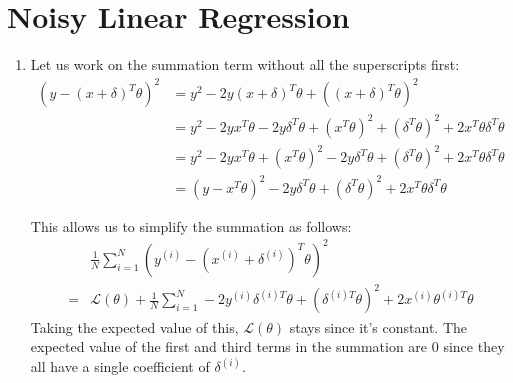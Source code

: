 \documentclass[12pt]{article}
\begin{document}
\section{Noisy Linear Regression}

\begin{enumerate}[label=(\alph*)]
      \item Let us work on the summation term without all the superscripts first:
            \begin{align*}
                  \left(y-(x+\delta)^T\theta\right)^2
                   & = y^2-2y(x+\delta)^T\theta+((x+\delta)^T\theta)^2                                                                  \\
                   & = y^2-2yx^T\theta-2y\delta^T\theta+\left(x^T\theta\right)^2+\left(\delta^T\theta\right)^2+2x^T\theta\delta^T\theta \\
                   & = y^2-2yx^T\theta+\left(x^T\theta\right)^2-2y\delta^T\theta+\left(\delta^T\theta\right)^2+2x^T\theta\delta^T\theta \\
                   & = \left(y-x^T\theta\right)^2-2y\delta^T\theta+\left(\delta^T\theta\right)^2+2x^T\theta\delta^T\theta
            \end{align*}

            This allows us to simplify the summation as follows:
            \begin{align*}
                      & \frac{1}{N} \sum_{i=1}^{N} \left(y^{(i)}-\left(x^{(i)}+\delta^{(i)}\right)^T\theta\right)^2                                               \\
                  ={} & \mathcal{L}(\theta)+\frac{1}{N}\sum_{i=1}^{N} -2y^{(i)}\delta^{(i)T}\theta+\left(\delta^{(i)T}\theta\right)^2+2x^{(i)}\theta^{(i)T}\theta
            \end{align*}
            Taking the expected value of this, $\mathcal{L}(\theta)$ stays since it's constant.
            The expected value of the first and third terms in the summation are $0$ since
            they all have a single coefficient of $\delta^{(i)}$.


\end{enumerate}
\end{document}
